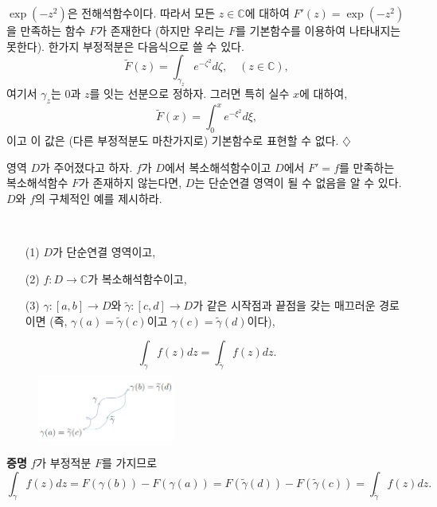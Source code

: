 \begin{saltexample}[label=example-3-10]{}{}
$\exp(-z^2)$은 전해석함수이다.
따라서 모든 $z\in\mathbb C$에 대하여 $F'(z)= \exp(-z^2)$을 만족하는 함수 $F$가 존재한다
(하지만 우리는 $F$를 기본함수를 이용하여 나타내지는 못한다).
한가지 부정적분은 다음식으로 쓸 수 있다.
\[
\tilde F(z) = \int_{\gamma_z} e^{-\zeta^2} d\zeta, \quad (z\in\mathbb C),
\]
여기서 $\gamma_z$는 $0$과 $z$를 잇는 선분으로 정하자.
그러면 특히 실수 $x$에 대하여,
\[
\tilde F(x) = \int_0^x e^{-\xi^2} d\xi,
\]
이고 이 값은 (다른 부정적분도 마찬가지로) 기본함수로 표현할 수 없다.
\hfill $\diamondsuit$
\end{saltexample}

\begin{salt_exercise} \label{ex-3-23}
영역 $D$가 주어졌다고 하자.
$f$가 $D$에서 복소해석함수이고 $D$에서 $F'=f$를 만족하는
복소해석함수 $F$가 존재하지 않는다면,
$D$는 단순연결 영역이 될 수 없음을 알 수 있다.
$D$와 $f$의 구체적인 예를 제시하라.
\end{salt_exercise}

\begin{salt_corollary} \label{coro-3-3}
\
\begin{itemize}
\item[(1)] $D$가 단순연결 영역이고,
\item[(2)] $f:D\to\mathbb C$가 복소해석함수이고,
\item[(3)] $\gamma :[a,b] \to D$와 $\tilde\gamma :[c,d] \to D$가 
같은 시작점과 끝점을 갖는 매끄러운 경로이면
(즉, $\gamma(a) = \tilde\gamma(c)$이고 $\gamma(c) = \tilde\gamma(d)$이다),
\end{itemize}
\[
\int_\gamma f(z) dz = \int_{\tilde\gamma} f(z)dz.
\]
\end{salt_corollary}

\begin{figure}[h!]
\begin{center}
\includegraphics[width=0.4\textwidth]{./SaltChapter/fig-3-0-6}
\end{center}
\end{figure}

{\bf 증명}
$f$가 부정적분 $F$를 가지므로
\[
\int_\gamma f(z) dz = F(\gamma(b)) - F(\gamma(a))
= F(\tilde\gamma(d)) - F(\tilde\gamma(c))
= \int_{\tilde\gamma} f(z)dz.
\]

